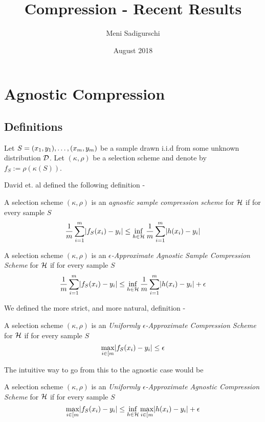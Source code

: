 \documentclass{article}
\title{Compression - Recent Results}
\author{Meni Sadigurschi}
\date{August 2018}
\begin{document}
\maketitle

\section{Agnostic Compression}
\subsection{Definitions}

Let $S = (x_1,y_1),\ldots,(x_{m},y_{m})$ be a sample drawn i.i.d from some unknown distribution $\mathcal{D}$. 
Let $(\kappa,\rho)$  be a selection scheme
and denote by $f_S := \rho(\kappa(S))$.

David et. al \cite{david2016supervised} defined the following definition -

\begin{definition}
A selection scheme $(\kappa,\rho)$ 
is an \emph{agnostic sample compression scheme} 
for $\mathcal{H}$ if for every sample $S$
\[ 
\frac{1}{m}\sum_{i=1}^{m} \lvert f_S (x_i) - y_i\rvert \leq 
\inf_{h\in\mathcal{H}} \frac{1}{m}\sum_{i=1}^{m} \lvert h (x_i) - y_i\rvert
\] 
\end{definition}

\begin{definition} \label{approx-agnos-def}
A selection scheme $(\kappa,\rho)$ 
is an \emph{$\epsilon$-Approximate Agnostic Sample Compression Scheme} for $\mathcal{H}$ 
if for every sample $S$
\[ 
\frac{1}{m}\sum_{i=1}^{m} \lvert f_S (x_i) - y_i\rvert \leq 
\inf_{h\in\mathcal{H}} \frac{1}{m}\sum_{i=1}^{m} \lvert h (x_i) - y_i\rvert + \epsilon
\] 
\end{definition}

We defined the more strict, and more natural, definition -

\begin{definition}
A selection scheme $(\kappa,\rho)$ 
is an \emph{Uniformly $\epsilon$-Approximate Compression Scheme} for $\mathcal{H}$ 
if for every sample $S$
\[ \max_{i\in [m} \lvert f_S (x_i) - y_i\rvert \leq \epsilon \]
\end{definition}

The intuitive way to go from this to the agnostic case would be

\begin{definition}
A selection scheme $(\kappa,\rho)$ 
is an \emph{Uniformly $\epsilon$-Approximate Agnostic Compression Scheme} for $\mathcal{H}$ 
if for every sample $S$
\[ \max_{i\in [m} \lvert f_S (x_i) - y_i\rvert 
\leq \inf_{h\in\mathcal{H}} \max_{i\in [m} \lvert h (x_i) - y_i\rvert + \epsilon \]
\end{definition}
\end{document}
